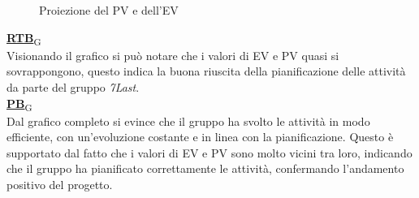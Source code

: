 \begin{figure*}[!h]
    \caption{Proiezione del PV e dell'EV}
\end{figure*}

\begin{flushleft}
\href{https://7last.github.io/docs/pb/documentazione-interna/glossario\#requirements-and-technology-baseline}{\textbf{RTB}\textsubscript{G}} \\
Visionando il grafico si può notare che i valori di EV e PV quasi si sovrappongono, questo indica la buona riuscita della pianificazione delle attività da parte del gruppo \textit{7Last}. \\
\href{https://7last.github.io/docs/pb/documentazione-interna/glossario\#product-baseline}{\textbf{PB}\textsubscript{G}} \\
Dal grafico completo si evince che il gruppo ha svolto le attività in modo efficiente, con un'evoluzione costante e in linea con la pianificazione. Questo è supportato dal fatto che i valori di EV e PV sono molto vicini tra loro, indicando che il gruppo ha pianificato correttamente le attività, confermando l'andamento positivo del progetto.
\end{flushleft}
    
\newpage
